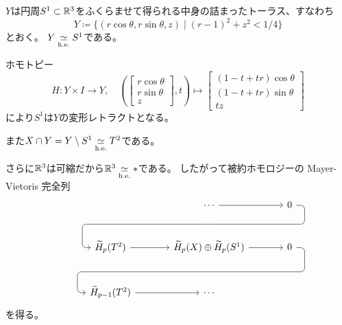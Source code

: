 \documentclass[report]{jlreq}
\begin{document}
\begin{answer}
    $Y$は円周$S^1 \subset \mathbb{R}^3$をふくらませて得られる中身の詰まったトーラス、すなわち
    \begin{equation}
        Y \coloneqq \{
            (r \cos\theta, r \sin\theta, z)
            \mid
            (r - 1)^2 + z^2 < 1 / 4
        \}
    \end{equation}
    とおく。
    $Y \simeqhe S^1$である。
    \begin{innerproof}
        ホモトピー
        \begin{equation}
            H \colon Y \times I \to Y,
            \quad
            \left(
                \begin{bmatrix}
                    r \cos\theta \\
                    r \sin\theta \\
                    z
                \end{bmatrix},
                t
            \right)
            \mapsto
            \begin{bmatrix}
                (1 - t + tr) \cos\theta \\
                (1 - t + tr) \sin\theta \\
                tz
            \end{bmatrix}
        \end{equation}
        により$S^1$は$Y$の変形レトラクトとなる。
    \end{innerproof}
    また$X \cap Y = Y \setminus S^1 \simeqhe T^2$である。
    \begin{innerproof}
        \TODO{}
    \end{innerproof}
    さらに$\mathbb{R}^3$は可縮だから$\R^3 \simeqhe *$である。
    したがって被約ホモロジーの Mayer-Vietoris 完全列
    \begin{equation}
        \begin{tikzcd}[column sep=large, row sep=large]
            && \cdots
                \ar{r} \ar[phantom]{d}[name=X1, anchor=center]{}
                & 0
                    \ar[rounded corners,
                        to path={
                            -- ([xshift=2ex]\tikztostart.east)
                            |- (X1.center) \tikztonodes
                            -| ([xshift=-2ex]\tikztotarget.west)
                            -- (\tikztotarget)
                        }]{dll} \\
            & \widetilde{H}_p(T^2)
                \ar{r}
                & \widetilde{H}_p(X) \oplus \widetilde{H}_p(S^1)
                    \ar{r}
                    \ar[phantom]{d}[name=X2, anchor=center]{}
                & 0
                    \ar[rounded corners,
                        to path={
                            -- ([xshift=2ex]\tikztostart.east)
                            |- (X2.center) \tikztonodes
                            -| ([xshift=-2ex]\tikztotarget.west)
                            -- (\tikztotarget)
                        }]{dll} \\
            & \widetilde{H}_{p - 1}(T^2)
                \ar{r}
                & \cdots
        \end{tikzcd}
    \end{equation}
    を得る。


\end{answer}
\end{document}
